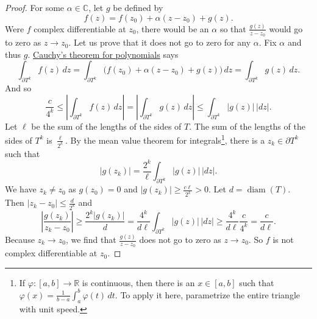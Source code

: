 \documentclass[12pt,openany]{book}
\newcommand{\sabs}[1]{\lvert {#1} \rvert}
\newcommand{\abs}[1]{\left\lvert {#1} \right\rvert}
\newcommand{\C}{{\mathbb{C}}}
\newcommand{\R}{{\mathbb{R}}}
\theoremstyle{plain}
\theoremstyle{remark}
\theoremstyle{definition}
\theoremstyle{exercise}
\theoremstyle{example}
\begin{document}
\begin{proof}
For some $\alpha \in \C$, let $g$ be defined by
\begin{equation*}
f(z) = f(z_0) + \alpha (z-z_0) + g(z) .
\end{equation*}
Were $f$ complex differentiable at $z_0$, there would be an $\alpha$ so that
$\frac{g(z)}{z-z_0}$ would go to zero as $z \to z_0$.
Let us prove that it does not go to zero for any $\alpha$.  Fix $\alpha$
and thus $g$.
\hyperref[cor:cauchyforpoly]{Cauchy's theorem for polynomials} says
\begin{equation*}
\int_{\partial T^k} f(z) \, dz =
\int_{\partial T^k} \bigl( f(z_0) + \alpha (z-z_0) + g(z) \bigr) \, dz =
\int_{\partial T^k} g(z) \, dz .
\end{equation*}
And so
\begin{equation*}
\frac{c}{4^k} \leq
\abs{
\int_{\partial T^k} f(z) \, dz
} =
\abs{
\int_{\partial T^k} g(z) \, dz 
}
\leq
\int_{\partial T^k} \sabs{g(z)} \, \sabs{dz} .
\end{equation*}
Let $\ell$ be the sum of the lengths of the sides of $T$.
The sum of the lengths of the sides of $T^k$ is
$\frac{\ell}{2^k}$.
By the mean value theorem for integrals\footnote{%
If $\varphi \colon [a,b] \to \R$ is continuous, then there is an $x \in [a,b]$
such that $\varphi(x) = \frac{1}{b-a} \int_a^b \varphi(t) \, dt$.
To apply it here, parametrize the entire triangle with unit speed.},
there is a $z_k \in \partial T^k$ such that
\begin{equation*}
\sabs{g(z_k)} = 
\frac{2^k}{\ell}
\int_{\partial T^k} \sabs{g(z)} \, \sabs{dz} .
\end{equation*}
We have $z_k \not= z_0$ as $g(z_0)=0$
and $\sabs{g(z_k)} \geq \frac{c \ell}{2^k} > 0$.
Let $d = \operatorname{diam}(T)$.  Then
$\sabs{z_k-z_0} \leq \frac{d}{2^k}$ and
\begin{equation*}
\abs{\frac{g(z_k)}{z_k-z_0}}
\geq
\frac{2^k\sabs{g(z_k)}}{d}
=
\frac{4^k}{d \ell}
\int_{\partial T^k} \sabs{g(z)} \, \sabs{dz}
\geq
\frac{4^k}{d \ell}
\frac{c}{4^k} = \frac{c}{d \ell} .
\end{equation*}
Because $z_k \to z_0$, we find that $\frac{g(z)}{z-z_0}$ does not 
go to zero as $z \to z_0$.  So $f$ is not complex differentiable at $z_0$.
\end{proof}
\end{document}
